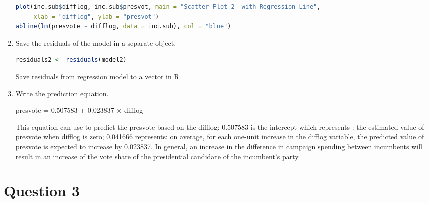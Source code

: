 \documentclass[12pt,letterpaper]{article}
\begin{document}
\begin{enumerate}
\begin{lstlisting}[language=R] 
plot(inc.sub$difflog, inc.sub$presvot, main = "Scatter Plot 2  with Regression Line", 
     xlab = "difflog", ylab = "presvot")
abline(lm(presvote ~ difflog, data = inc.sub), col = "blue")

\end{lstlisting} 
  
		\item Save the residuals of the model in a separate object.	\vspace{1cm}
\begin{lstlisting}[language=R] 
residuals2 <- residuals(model2)
\end{lstlisting} 
Save residuals from regression model to a vector in R
  
		\item Write the prediction equation.

presvote = 0.507583 + 0.023837 × difflog

This equation can use to predict the presvote based on the difflog: 0.507583 is the intercept which represents : the estimated value of presvote when difflog is zero; 0.041666 represents:  on average, for each one-unit increase in the difflog variable, the  predicted value of presvote is expected to increase by 0.023837. In general,  an increase in the difference in campaign spending between incumbents will result in an increase of the vote share of the presidential candidate of the incumbent’s party.

	\end{enumerate}
	
	\newpage	
\section*{Question 3}
\end{document}
